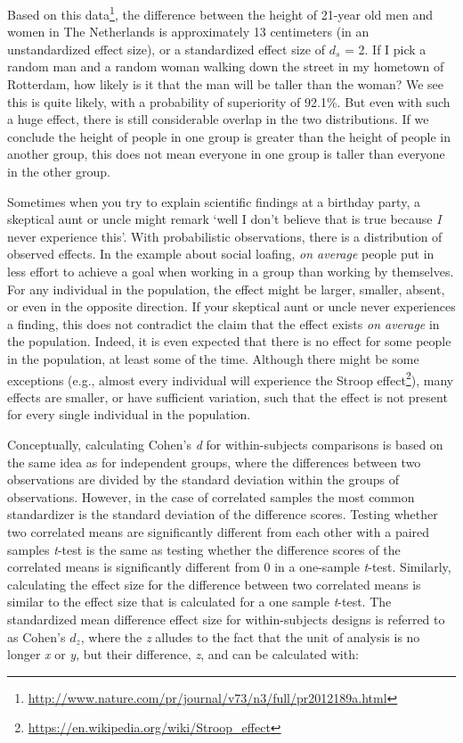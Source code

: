 \documentclass[
  oneside]{krantz}
\renewcommand{\href}[2]{#2\footnote{\url{#1}}}
\begin{document}
Based on \href{http://www.nature.com/pr/journal/v73/n3/full/pr2012189a.html}{this data}, the difference between the height of 21-year old men and women in The Netherlands is approximately 13 centimeters (in an unstandardized effect size), or a standardized effect size of \(d_s\) = 2. If I pick a random man and a random woman walking down the street in my hometown of Rotterdam, how likely is it that the man will be taller than the woman? We see this is quite likely, with a probability of superiority of 92.1\%. But even with such a huge effect, there is still considerable overlap in the two distributions. If we conclude the height of people in one group is greater than the height of people in another group, this does not mean everyone in one group is taller than everyone in the other group.

Sometimes when you try to explain scientific findings at a birthday party, a skeptical aunt or uncle might remark `well I don't believe that is true because \emph{I} never experience this'. With probabilistic observations, there is a distribution of observed effects. In the example about social loafing, \emph{on average} people put in less effort to achieve a goal when working in a group than working by themselves. For any individual in the population, the effect might be larger, smaller, absent, or even in the opposite direction. If your skeptical aunt or uncle never experiences a finding, this does not contradict the claim that the effect exists \emph{on average} in the population. Indeed, it is even expected that there is no effect for some people in the population, at least some of the time. Although there might be some exceptions (e.g., almost every individual will experience the \href{https://en.wikipedia.org/wiki/Stroop_effect}{Stroop effect}), many effects are smaller, or have sufficient variation, such that the effect is not present for every single individual in the population.

Conceptually, calculating Cohen's \emph{d} for within-subjects comparisons is based on the same idea as for independent groups, where the differences between two observations are divided by the standard deviation within the groups of observations. However, in the case of correlated samples the most common standardizer is the standard deviation of the difference scores. Testing whether two correlated means are significantly different from each other with a paired samples \emph{t}-test is the same as testing whether the difference scores of the correlated means is significantly different from 0 in a one-sample \emph{t}-test. Similarly, calculating the effect size for the difference between two correlated means is similar to the effect size that is calculated for a one sample \emph{t}-test. The standardized mean difference effect size for within-subjects designs is referred to as Cohen's \(d_z\), where the \emph{z} alludes to the fact that the unit of analysis is no longer \emph{x} or \emph{y}, but their difference, \emph{z}, and can be calculated with:
\end{document}
